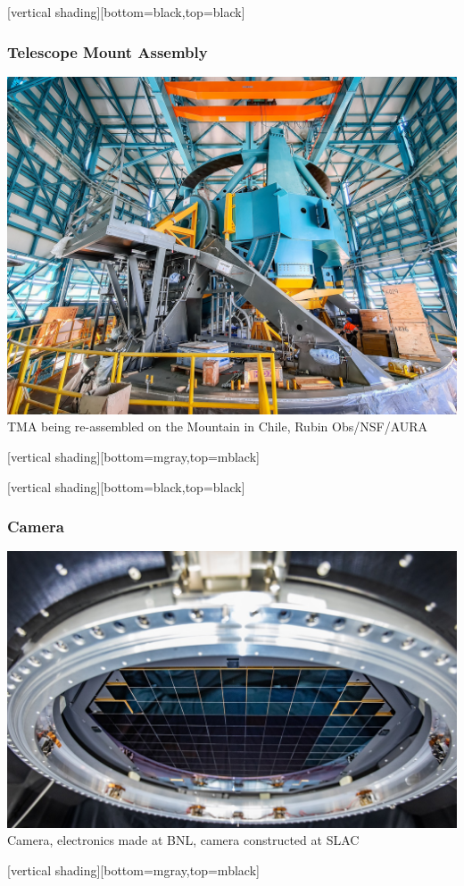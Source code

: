\documentclass{beamer}
\begin{document}
{
    [vertical shading][bottom=black,top=black]
	
    \frame
    {
        \frametitle{Telescope Mount Assembly}
        \begin{center}
            \includegraphics[height=0.8\textheight]{Some_Assembly_Required.jpg}
            \newline
            {\tiny TMA being re-assembled on the Mountain in Chile,
            Rubin Obs/NSF/AURA}
        \end{center}
    }

    [vertical shading][bottom=mgray,top=mblack]

}


{
    [vertical shading][bottom=black,top=black]
	
    \frame
    {
        \frametitle{Camera}
        \begin{center}
            \includegraphics[height=0.7\textheight]{lsstcam-focalplane-hr.jpg}
            \newline
            {\tiny Camera, electronics made at BNL, camera constructed at SLAC}
        \end{center}
    }

    [vertical shading][bottom=mgray,top=mblack]

}
\end{document}
